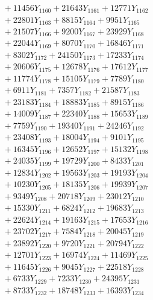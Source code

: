 \documentclass[a4paper,10pt]{article}
\begin{document}
{\begin{align}
&\;  + 11456 Y_{1160} + 21643 Y_{1161} + 12771 Y_{1162} \\[0.3ex]
&\;  + 22801 Y_{1163} + 8815 Y_{1164} + 9951 Y_{1165} \\[0.3ex]
&\;  + 21507 Y_{1166} + 9200 Y_{1167} + 23929 Y_{1168} \\[0.5ex]\allowbreak
&\;  + 22044 Y_{1169} + 8070 Y_{1170} + 16846 Y_{1171} \\[0.3ex]
&\;  + 8302 Y_{1172} + 24150 Y_{1173} + 17233 Y_{1174} \\[0.3ex]
&\;  + 20606 Y_{1175} + 12678 Y_{1176} + 17612 Y_{1177} \\[0.3ex]
&\;  + 11774 Y_{1178} + 15105 Y_{1179} + 7789 Y_{1180} \\[0.3ex]
&\;  + 6911 Y_{1181} + 7357 Y_{1182} + 21587 Y_{1183} \\[0.3ex]
&\;  + 23183 Y_{1184} + 18883 Y_{1185} + 8915 Y_{1186} \\[0.3ex]
&\;  + 14009 Y_{1187} + 22340 Y_{1188} + 15653 Y_{1189} \\[0.3ex]
&\;  + 7759 Y_{1190} + 19340 Y_{1191} + 24246 Y_{1192} \\[0.3ex]
&\;  + 23408 Y_{1193} + 18004 Y_{1194} + 9101 Y_{1195} \\[0.3ex]
&\;  + 16345 Y_{1196} + 12652 Y_{1197} + 15132 Y_{1198} \\[0.5ex]\allowbreak
&\;  + 24035 Y_{1199} + 19729 Y_{1200} + 8433 Y_{1201} \\[0.3ex]
&\;  + 12834 Y_{1202} + 19563 Y_{1203} + 19193 Y_{1204} \\[0.3ex]
&\;  + 10230 Y_{1205} + 18135 Y_{1206} + 19939 Y_{1207} \\[0.3ex]
&\;  + 9349 Y_{1208} + 20718 Y_{1209} + 23012 Y_{1210} \\[0.3ex]
&\;  + 15330 Y_{1211} + 6824 Y_{1212} + 19683 Y_{1213} \\[0.3ex]
&\;  + 22624 Y_{1214} + 19163 Y_{1215} + 17653 Y_{1216} \\[0.3ex]
&\;  + 23702 Y_{1217} + 7584 Y_{1218} + 20045 Y_{1219} \\[0.3ex]
&\;  + 23892 Y_{1220} + 9720 Y_{1221} + 20794 Y_{1222} \\[0.3ex]
&\;  + 12701 Y_{1223} + 16974 Y_{1224} + 11469 Y_{1225} \\[0.3ex]
&\;  + 11645 Y_{1226} + 9045 Y_{1227} + 22518 Y_{1228} \\[0.5ex]\allowbreak
&\;  + 6733 Y_{1229} + 7233 Y_{1230} + 24395 Y_{1231} \\[0.3ex]
&\;  + 8733 Y_{1232} + 18748 Y_{1233} + 16393 Y_{1234} \\[0.3ex]

\end{align}}
\end{document}
